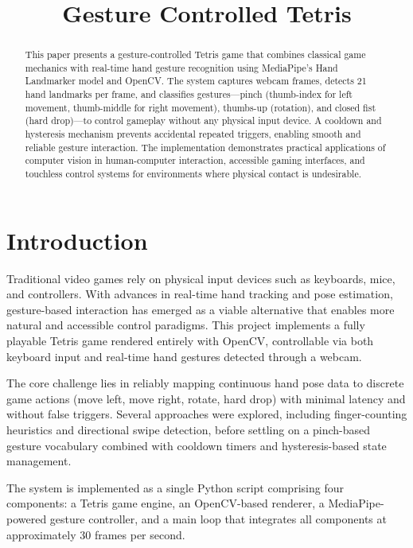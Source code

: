 \documentclass[conference]{IEEEtran}
\begin{document}
\title{Gesture Controlled Tetris}
\author{}
\maketitle

\begin{abstract}
This paper presents a gesture-controlled Tetris game that combines classical game mechanics with real-time hand gesture recognition using MediaPipe's Hand Landmarker model and OpenCV. The system captures webcam frames, detects 21 hand landmarks per frame, and classifies gestures---pinch (thumb-index for left movement, thumb-middle for right movement), thumbs-up (rotation), and closed fist (hard drop)---to control gameplay without any physical input device. A cooldown and hysteresis mechanism prevents accidental repeated triggers, enabling smooth and reliable gesture interaction. The implementation demonstrates practical applications of computer vision in human-computer interaction, accessible gaming interfaces, and touchless control systems for environments where physical contact is undesirable.
\end{abstract}

\section{Introduction}

Traditional video games rely on physical input devices such as keyboards, mice, and controllers. With advances in real-time hand tracking and pose estimation, gesture-based interaction has emerged as a viable alternative that enables more natural and accessible control paradigms. This project implements a fully playable Tetris game rendered entirely with OpenCV, controllable via both keyboard input and real-time hand gestures detected through a webcam.

The core challenge lies in reliably mapping continuous hand pose data to discrete game actions (move left, move right, rotate, hard drop) with minimal latency and without false triggers. Several approaches were explored, including finger-counting heuristics and directional swipe detection, before settling on a pinch-based gesture vocabulary combined with cooldown timers and hysteresis-based state management.

The system is implemented as a single Python script comprising four components: a Tetris game engine, an OpenCV-based renderer, a MediaPipe-powered gesture controller, and a main loop that integrates all components at approximately 30 frames per second.
\end{document}
